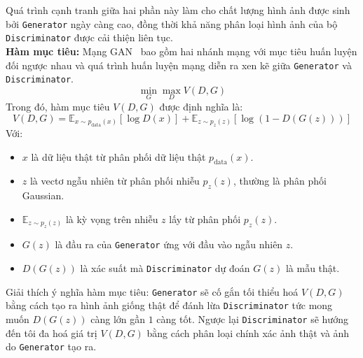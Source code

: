 Quá trình cạnh tranh giữa hai phần này làm cho chất lượng hình ảnh được sinh bởi \texttt{Generator} ngày càng cao, đồng thời khả năng phân loại hình ảnh của bộ \texttt{Discriminator} được cải thiện liên tục.\\
%
 \textbf{Hàm mục tiêu:}
%
Mạng GAN~\cite{Goodfellow2014GenerativeAN} bao gồm hai nhánh mạng với mục tiêu huấn luyện đối ngược nhau và quá trình huấn luyện mạng diễn ra xen kẽ giữa \texttt{Generator} và \texttt{Discriminator}.\\
\[
\min_G \max_D V(D, G)
\]
Trong đó, hàm mục tiêu \( V(D, G) \) được định nghĩa là:
\[
V(D, G) = \mathbb{E}_{x \sim p_{\text{data}}(x)} \left[ \log D(x) \right] + \mathbb{E}_{z \sim p_z(z)} \left[ \log (1 - D(G(z))) \right]
\]
%
Với:
\begin{itemize}
	\item \(x\) là dữ liệu thật từ phân phối dữ liệu thật \(p_{\text{data}}(x)\).
	\item \(z\) là vectơ ngẫu nhiên từ phân phối nhiễu \(p_z(z)\), thường là phân phối Gaussian.
	\item \( \mathbb{E}_{z \sim p_z(z)} \) là kỳ vọng trên nhiễu \( z \) lấy từ phân phối \( p_z(z) \).
	\item \( G(z) \) là đầu ra của \texttt{Generator} ứng với đầu vào ngẫu nhiên $z$.
	\item \( D(G(z)) \) là xác suất mà \texttt{Discriminator} dự đoán \( G(z) \) là mẫu thật.

\end{itemize}
%
Giải thích ý nghĩa hàm mục tiêu: \texttt{Generator} sẽ cố gắn tối thiểu hoá $V(D,G)$ bằng cách tạo ra hình ảnh giống thật để đánh lừa \texttt{Discriminator} tức mong muốn $D(G(z))$ càng lớn gần \(1\) càng tốt. Ngược lại \texttt{Discriminator} sẽ hướng đến tôi đa hoá giá trị  $V(D,G)$  bằng cách phân loại chính xác ảnh thật và ảnh do \texttt{Generator} tạo ra.
%
%
